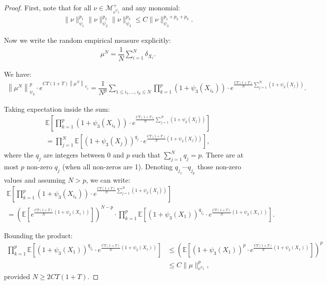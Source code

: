 \documentclass[11pt,a4paper]{article}
\newcommand{\MC}{\mathcal{M}}
\newcommand{\E}[1]{\mathbb{E}\left[#1\right]}
\begin{document}
\begin{proof}
    First, note that for all $\nu \in \MC^+_{e^{\psi_2}}$ and any monomial:
    \begin{align*}
        \|\nu\|_{\psi_1}^{p_1} \|\nu\|_{\psi_2}^{p_2} \|\nu\|_{\psi_3}^{p_3} \leq C \|\nu\|_{\psi_3}^{p_1 + p_2 + p_3}.
    \end{align*}
    
    Now we write the random empirical measure explicitly:
    \begin{align*}
        \mu^N = \dfrac{1}{N}\sum\limits_{i = 1}^N \delta_{X_i}.
    \end{align*}

    We have:
    \begin{align*}
        \left\|\mu^N\right\|_{\psi_3}^p \cdot e^{C T(1 + T)\left\|\mu^N\right\|_{\psi_2}} 
        = \dfrac{1}{N^p} \sum\limits_{1 \leq i_1,\dots,i_p \leq N} \prod_{k=1}^p \left(1 + \psi_3(X_{i_k})\right) \cdot e^{\frac{C T(1 + T)}{N} \sum\limits_{j = 1}^N (1 + \psi_2(X_j))}.
    \end{align*}

    Taking expectation inside the sum:
    \begin{multline*}
        \E{\prod_{k=1}^p \left(1 + \psi_3(X_{i_k})\right) \cdot e^{\frac{C T(1 + T)}{N} \sum_{j=1}^N (1 + \psi_2(X_j))}} \\
        = \prod_{j=1}^N \E{ \left(1 + \psi_3(X_j)\right)^{q_j} \cdot e^{\frac{C T(1 + T)}{N}(1 + \psi_2(X_j))}},
    \end{multline*}
    where the $q_j$ are integers between $0$ and $p$ such that $\sum_{j=1}^N q_j = p$. There are at most $p$ non-zero $q_j$ (when all non-zeros are 1). Denoting $q_{j_1} \cdots q_{j_p}$ those non-zero values and assuming $N > p$, we can write:
    \begin{multline*}
        \E{\prod_{k=1}^p \left(1 + \psi_3(X_{i_k})\right) \cdot e^{\frac{C T(1 + T)}{N} \sum_{j=1}^N (1 + \psi_2(X_j))}} \\
        = \left(\E{e^{\frac{C T(1 + T)}{N}(1 + \psi_2(X_1))}}\right)^{N-p}
        \cdot \prod_{k=1}^p \E{(1 + \psi_3(X_1))^{q_{j_k}} \cdot e^{\frac{C T(1 + T)}{N}(1 + \psi_2(X_1))}}.
    \end{multline*}

    Bounding the product:
    \begin{align*}
        \prod_{k=1}^p \E{(1 + \psi_3(X_1))^{q_{j_k}} \cdot e^{\frac{C T(1 + T)}{N}(1 + \psi_2(X_1))}}
        &\leq \left(\E{(1 + \psi_3(X_1))^p \cdot e^{\frac{C T(1 + T)}{N}(1 + \psi_2(X_1))}}\right)^p \\
        &\leq C \|\mu\|_{e^{\psi_2}}^p,
    \end{align*}
    provided $N \geq 2 C T(1 + T)$.


\end{proof}
\end{document}
